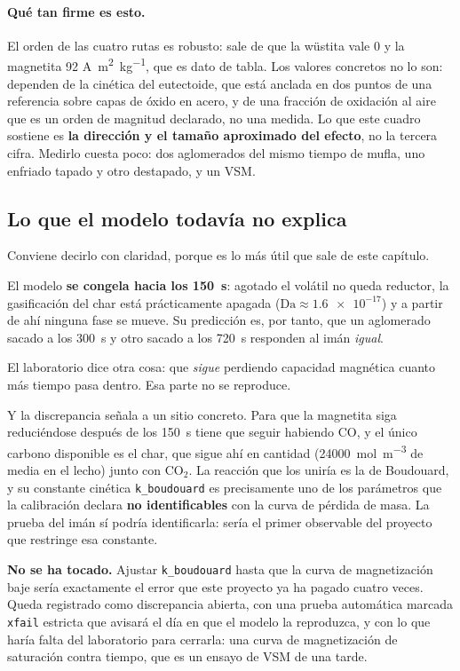 \documentclass[11pt,a4paper]{article}
\newcommand{\ojo}[1]{\textcolor{aviso}{\textbf{#1}}}
\begin{document}
\paragraph{Qué tan firme es esto.} El orden de las cuatro rutas es robusto: sale
de que la wüstita vale 0 y la magnetita 92
\si{\ampere\meter\squared\per\kilo\gram}, que es dato de tabla. Los valores
concretos no lo son: dependen de la cinética del eutectoide, que está anclada en
dos puntos de una referencia sobre capas de óxido en acero, y de una fracción de
oxidación al aire que es un orden de magnitud declarado, no una medida. Lo que
este cuadro sostiene es \textbf{la dirección y el tamaño aproximado del efecto},
no la tercera cifra. Medirlo cuesta poco: dos aglomerados del mismo tiempo de
mufla, uno enfriado tapado y otro destapado, y un VSM.

\subsection{Lo que el modelo todavía no explica}
\label{sec:discrepancia}

Conviene decirlo con claridad, porque es lo más útil que sale de este capítulo.

El modelo \textbf{se congela hacia los \SI{150}{\second}}: agotado el volátil no
queda reductor, la gasificación del char está prácticamente apagada
($\mathrm{Da} \approx \num{1.6e-17}$) y a partir de ahí ninguna fase se mueve.
Su predicción es, por tanto, que un aglomerado sacado a los \SI{300}{\second} y
otro sacado a los \SI{720}{\second} responden al imán \emph{igual}.

El laboratorio dice otra cosa: que \emph{sigue} perdiendo capacidad magnética
cuanto más tiempo pasa dentro. Esa parte no se reproduce.

Y la discrepancia señala a un sitio concreto. Para que la magnetita siga
reduciéndose después de los \SI{150}{\second} tiene que seguir habiendo CO, y el
único carbono disponible es el char, que sigue ahí en cantidad
(\qty{24000}{\mole\per\meter\cubed} de media en el lecho) junto con CO$_2$. La
reacción que los uniría es la de Boudouard, y su constante cinética
\texttt{k\_boudouard} es precisamente uno de los parámetros que la calibración
declara \textbf{no identificables} con la curva de pérdida de masa. La prueba
del imán sí podría identificarla: sería el primer observable del proyecto que
restringe esa constante.

\ojo{No se ha tocado.} Ajustar \texttt{k\_boudouard} hasta que la curva de
magnetización baje sería exactamente el error que este proyecto ya ha pagado
cuatro veces. Queda registrado como discrepancia abierta, con una prueba
automática marcada \texttt{xfail} estricta que avisará el día en que el modelo
la reproduzca, y con lo que haría falta del laboratorio para cerrarla: una curva
de magnetización de saturación contra tiempo, que es un ensayo de VSM de una
tarde.
\end{document}
